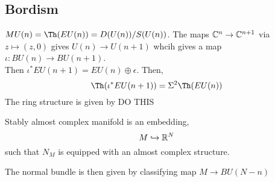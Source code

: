 \documentclass[12pt]{article}
\begin{document}
\subsection{Bordism}

$MU(n) = \Th(E U(n)) = D(U(n)) / S(U(n))$.
The maps $\mathbb{C}^n \to \mathbb{C}^{n+1}$ via $z \mapsto (z,0)$ gives $U(n) \to U(n+1)$ whcih gives a map $\iota : B U(n) \to B U(n+1)$.
\bigskip\\
Then $\iota^* EU(n+1) = EU(n) \oplus \epsilon$. Then,
\[ \Th(\iota^* EU(n+1)) = \Sigma^2 \Th(EU(n)) \]
The ring structure is given by 
DO THIS


\begin{defn}
Stably almost complex manifold is an embedding,
\[ M \hookrightarrow \mathbb{R}^N \]
such that $N_{M}$ is equipped with an almost complex structure.
\end{defn}

The normal bundle is then given by classifying map $M \to BU(N-n)$
\end{document}
